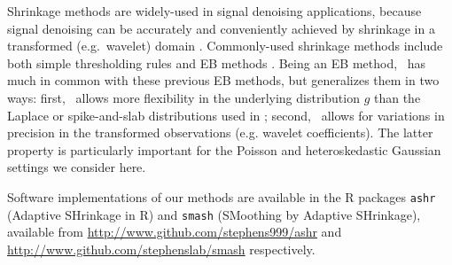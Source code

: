 \documentclass[12pt]{article}
\begin{document}
Shrinkage methods are widely-used in signal denoising applications, because signal denoising can be accurately and conveniently achieved by shrinkage in a transformed (e.g.~wavelet) domain \cite{Donoho1994Ideal}. 
Commonly-used shrinkage methods include both
simple thresholding rules \cite{Coifman1995Translationinvariant, Donoho1994Ideal, donoho95} and EB methods \cite{Johnstone2005Empirical, Clyde2000Flexible}.
Being an EB method, \ash~has much in common with these previous EB methods, but generalizes them in two ways: first, 
\ash~allows more flexibility in the underlying distribution $g$ than the Laplace or spike-and-slab
distributions used in \cite{Johnstone2005Empirical, Clyde2000Flexible}; second, \ash~allows for variations in precision in the transformed observations (e.g. wavelet coefficients). The latter property is particularly important for
the Poisson and heteroskedastic Gaussian settings we consider here.

Software implementations of our methods are available in the R packages {\tt ashr} (Adaptive SHrinkage in R)
and {\tt smash} (SMoothing by Adaptive SHrinkage), available from 
\url{http://www.github.com/stephens999/ashr} and \url{http://www.github.com/stephenslab/smash} respectively. 



\end{document}
